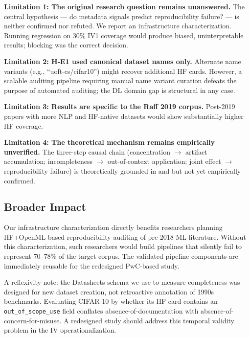 \textbf{Limitation 1: The original research question remains unanswered.} The central hypothesis --- do metadata signals predict reproducibility failure? --- is neither confirmed nor refuted. We report an infrastructure characterization. Running regression on 30\% IV1 coverage would produce biased, uninterpretable results; blocking was the correct decision.

\textbf{Limitation 2: H-E1 used canonical dataset names only.} Alternate name variants (e.g., ``uoft-cs/cifar10'') might recover additional HF cards. However, a scalable auditing pipeline requiring manual name variant curation defeats the purpose of automated auditing; the DL domain gap is structural in any case.

\textbf{Limitation 3: Results are specific to the Raff 2019 corpus.} Post-2019 papers with more NLP and HF-native datasets would show substantially higher HF coverage.

\textbf{Limitation 4: The theoretical mechanism remains empirically unverified.} The three-step causal chain (concentration $\to$ artifact accumulation; incompleteness $\to$ out-of-context application; joint effect $\to$ reproducibility failure) is theoretically grounded in \citet{DAm2021Underspecification} and \citet{Gebru2021Datasheets} but not yet empirically confirmed.

\subsection{Broader Impact}

Our infrastructure characterization directly benefits researchers planning HF+OpenML-based reproducibility auditing of pre-2018 ML literature. Without this characterization, such researchers would build pipelines that silently fail to represent 70--78\% of the target corpus. The validated pipeline components are immediately reusable for the redesigned PwC-based study.

A reflexivity note: the Datasheets schema we use to measure completeness was designed for new dataset creation, not retroactive annotation of 1990s benchmarks. Evaluating CIFAR-10 by whether its HF card contains an \texttt{out\_of\_scope\_use} field conflates absence-of-documentation with absence-of-concern-for-misuse. A redesigned study should address this temporal validity problem in the IV operationalization.
